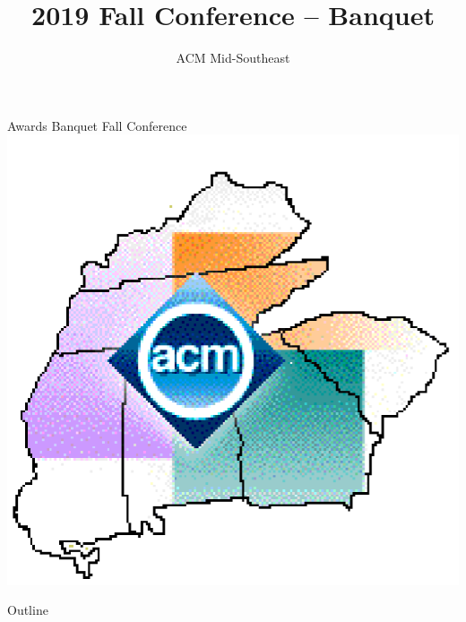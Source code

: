 \documentclass[]{beamer}
\title{2019 Fall Conference -- Banquet}
\author{ACM Mid-Southeast}
\institute[Maryville College] %
{
  Division of Mathematics and Computer Science\\
  Maryville College
}
\date[]{}
\begin{document}
\begin{frame}
  \begin{center}
    {\color{acmblue}\Huge Awards Banquet
        \vspace{0.5cm}
         Fall Conference} 
    \newline\includegraphics[height=0.5\textheight]{colorlogo}
  \end{center}
\end{frame}

\begin{frame}{Outline}
  \tableofcontents
\end{frame}




\end{document}
